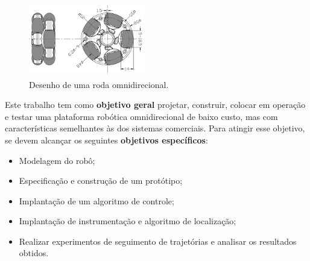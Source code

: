 \begin{figure}[h]
  \centering
  \includegraphics[width = 0.45\textwidth]{imagens/omniwheel}
  \caption{Desenho de uma roda omnidirecional.}
  \label{fig:omniwheel}
\end{figure}


Este trabalho tem como \textbf{objetivo geral} projetar, construir, colocar em operação e testar uma plataforma robótica omnidirecional de baixo custo, mas com características semelhantes às dos sistemas comerciais. Para atingir esse objetivo, se devem alcançar os seguintes \textbf{objetivos específicos}:

\begin{itemize}
  \item{Modelagem do robô;} %
  \item{Especificação e construção de um protótipo;}
  \item{Implantação de um algoritmo de controle;} %
  \item{Implantação de instrumentação e algoritmo de localização;}
  \item{Realizar experimentos de seguimento de trajetórias e analisar os resultados obtidos.}
\end{itemize}


